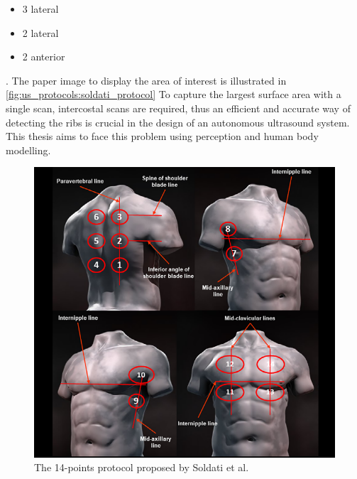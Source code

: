 \begin{itemize}
    \item 3 lateral
    \item 2 lateral
    \item 2 anterior
\end{itemize}.
The paper image to display the area of interest is illustrated in \autoref{fig:us_protocols:soldati_protocol}
To capture the largest surface area with a single scan, intercostal scans are required, thus an efficient and accurate way of detecting the ribs is crucial in the design of an autonomous ultrasound system. This thesis aims to face this problem using perception and human body modelling.
\begin{figure}[h]
    \centering
    \includegraphics[width=0.5\linewidth]{images/us_protocols/14-points-protocol.png}
    \caption{The 14-points protocol proposed by Soldati et al.}
    \label{fig:us_protocols:soldati_protocol}
\end{figure}